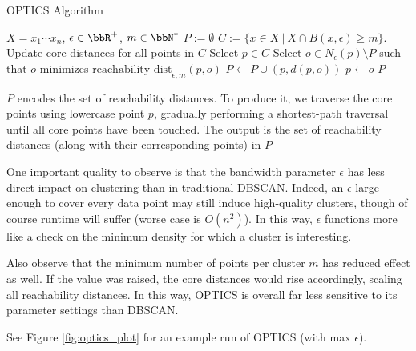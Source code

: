   \begin{algorithm}[H]
    \caption{OPTICS Algorithm}
    \label{optics alg}
    \begin{algorithmic}[1]
      \renewcommand\algorithmicrequire{\textbf{input}}
      \REQUIRE $X = {x_1\cdots x_n}$, $\epsilon \in \bbR^+$, $m \in \bbN^*$
      \STATE $P := \emptyset$
      \STATE $C:=\{x \in X \ | \ X \cap B(x, \epsilon) \geq m\}$.
      \STATE Update core distances for all points in $C$
      \STATE Select $p \in C$
       \STATE Select $o \in N_\epsilon (p) \setminus P$ such that $o$ minimizes $\text{reachability-dist}_{\epsilon, m}(p, o)$
       \STATE $P \leftarrow P \cup (p, d(p, o))$
       \STATE $p \leftarrow o$
      \ENDWHILE
      \RETURN $P$
    \end{algorithmic}
  \end{algorithm}
  
$P$ encodes the set of reachability distances. To produce it, we traverse the core points using lowercase point $p$, gradually performing a shortest-path traversal until all core points have been touched. The output is the set of reachability distances (along with their corresponding points) in $P$

One important quality to observe is that the bandwidth parameter $\epsilon$ has less direct impact on clustering than in traditional DBSCAN. Indeed, an $\epsilon$ large enough to cover every data point may still induce high-quality clusters, though of course runtime will suffer (worse case is $O(n^2)$). In this way, $\epsilon$ functions more like a check on the minimum density for which a cluster is interesting.

Also observe that the minimum number of points per cluster $m$ has reduced effect as well. If the value was raised, the core distances would rise accordingly, scaling all reachability distances. In this way, OPTICS is overall far less sensitive to its parameter settings than DBSCAN.  

See Figure \ref{fig:optics_plot} for an example run of OPTICS (with max $\epsilon$).

